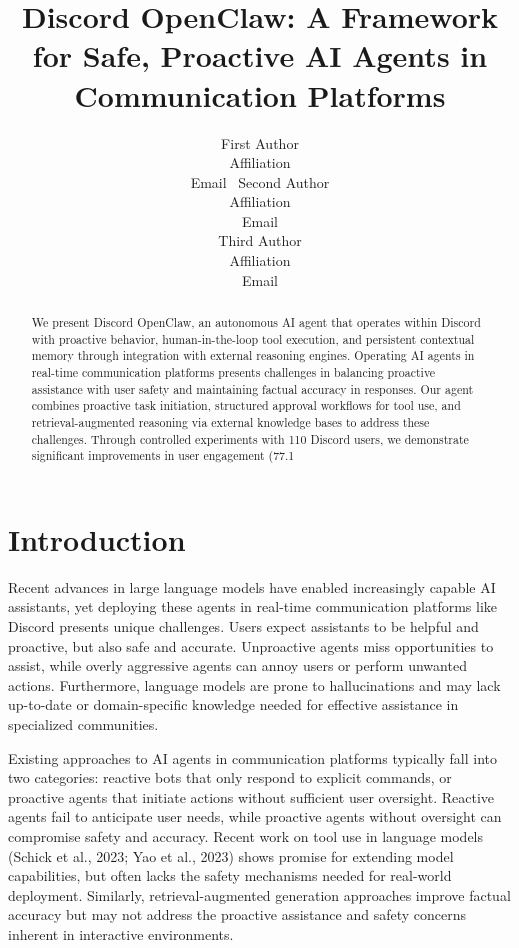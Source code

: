 \documentclass[letterpaper,10pt]{article}
\title{Discord OpenClaw: A Framework for Safe, Proactive AI Agents in Communication Platforms}
\author{First Author\\ Affiliation \\ Email \
        Second Author\\ Affiliation \\ Email \\
        Third Author\\ Affiliation \\ Email}
\date{}
\begin{document}
\maketitle
\begin{abstract}
We present Discord OpenClaw, an autonomous AI agent that operates within Discord with proactive behavior, human-in-the-loop tool execution, and persistent contextual memory through integration with external reasoning engines. Operating AI agents in real-time communication platforms presents challenges in balancing proactive assistance with user safety and maintaining factual accuracy in responses. Our agent combines proactive task initiation, structured approval workflows for tool use, and retrieval-augmented reasoning via external knowledge bases to address these challenges. Through controlled experiments with 110 Discord users, we demonstrate significant improvements in user engagement (77.1%
\end{abstract}

\section{Introduction}
Recent advances in large language models have enabled increasingly capable AI assistants, yet deploying these agents in real-time communication platforms like Discord presents unique challenges. Users expect assistants to be helpful and proactive, but also safe and accurate. Unproactive agents miss opportunities to assist, while overly aggressive agents can annoy users or perform unwanted actions. Furthermore, language models are prone to hallucinations and may lack up-to-date or domain-specific knowledge needed for effective assistance in specialized communities.

Existing approaches to AI agents in communication platforms typically fall into two categories: reactive bots that only respond to explicit commands, or proactive agents that initiate actions without sufficient user oversight. Reactive agents fail to anticipate user needs, while proactive agents without oversight can compromise safety and accuracy. Recent work on tool use in language models (Schick et al., 2023; Yao et al., 2023) shows promise for extending model capabilities, but often lacks the safety mechanisms needed for real-world deployment. Similarly, retrieval-augmented generation approaches improve factual accuracy but may not address the proactive assistance and safety concerns inherent in interactive environments.
\end{document}
